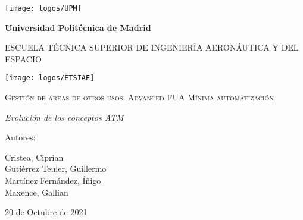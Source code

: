 \documentclass[12pt,a4paper,oneside]{book}
\renewcommand{\headrulewidth}{1pt}      %
\renewcommand{\footrulewidth}{1pt}      %
\renewcommand{\headrulewidth}{0pt}	%
\begin{document}
\begin{titlepage}
\centering
{\texttt{[image: logos/UPM]}\par}
\vspace{0.1cm}
{\bfseries\LARGE Universidad Politécnica de Madrid \par}
\vspace{0.5cm}
{\scshape\large ESCUELA TÉCNICA SUPERIOR DE INGENIERÍA AERONÁUTICA Y DEL ESPACIO \par}
\vspace{0.25cm}
{\texttt{[image: logos/ETSIAE]} \par}
\vspace{1cm}
{\scshape\Large  Gestión de áreas de otros usos. Advanced FUA Mínima automatización \par}
\vspace{0.7cm}
{\itshape\large Evolución de los conceptos ATM \par}
\vfill
{\Large Autores: \par}
{\large Cristea, Ciprian \\ Gutiérrez Teuler, Guillermo \\ Martínez Fernández, Íñigo \\ Maxence, Gallian \par}
\vfill
{\Large 20 de Octubre de 2021 \par}
\end{titlepage}

\frontmatter

{\hypersetup{linkcolor=black}		%
	\tableofcontents
	\cleardoublepage
	\listoffigures
	\cleardoublepage
	\listoftables
}

\printglossary[type=\acronymtype,title=Acrónimos,toctitle=Acrónimos]

\pagestyle{fancy}						%
\fancyhf{}								%
\fancyfoot[R]{\thepage/{\hypersetup{linkcolor=black}\pageref{LastPage}}}
\renewcommand{\headrulewidth}{1pt}      %
\renewcommand{\footrulewidth}{1pt}      %

\mainmatter








\backmatter

\nocite{*}	%

\printbibliography[heading=bibintoc,title={Bibliografía}]
\end{document}
